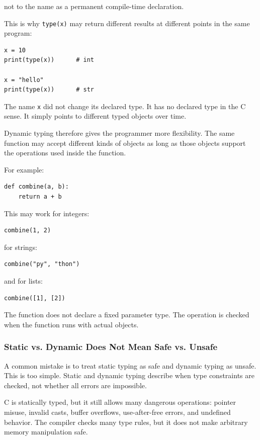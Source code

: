 not to the name as a permanent compile-time declaration.

This is why \texttt{type(x)} may return different results at different points in the same program:

\begin{verbatim}
x = 10
print(type(x))      # int

x = "hello"
print(type(x))      # str
\end{verbatim}

The name \texttt{x} did not change its declared type. It has no declared type in the C sense. It simply points to different typed objects over time.

Dynamic typing therefore gives the programmer more flexibility. The same function may accept different kinds of objects as long as those objects support the operations used inside the function.

For example:

\begin{verbatim}
def combine(a, b):
    return a + b
\end{verbatim}

This may work for integers:

\begin{verbatim}
combine(1, 2)
\end{verbatim}

for strings:

\begin{verbatim}
combine("py", "thon")
\end{verbatim}

and for lists:

\begin{verbatim}
combine([1], [2])
\end{verbatim}

The function does not declare a fixed parameter type. The operation is checked when the function runs with actual objects.

\subsubsection*{Static vs. Dynamic Does Not Mean Safe vs. Unsafe}

A common mistake is to treat static typing as safe and dynamic typing as unsafe. This is too simple. Static and dynamic typing describe when type constraints are checked, not whether all errors are impossible.

C is statically typed, but it still allows many dangerous operations: pointer misuse, invalid casts, buffer overflows, use-after-free errors, and undefined behavior. The compiler checks many type rules, but it does not make arbitrary memory manipulation safe.

